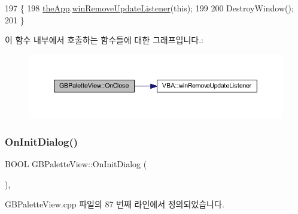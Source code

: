 \begin{DoxyCode}
197 \{
198   \mbox{\hyperlink{_v_b_a_8cpp_a8095a9d06b37a7efe3723f3218ad8fb3}{theApp}}.\mbox{\hyperlink{class_v_b_a_a2d31a0656df2230310aa8dc9e3a735d3}{winRemoveUpdateListener}}(\textcolor{keyword}{this});
199   
200   DestroyWindow();
201 \}
\end{DoxyCode}
이 함수 내부에서 호출하는 함수들에 대한 그래프입니다.\+:
\nopagebreak
\begin{figure}[H]
\begin{center}
\leavevmode
\includegraphics[width=350pt]{class_g_b_palette_view_a7cbc4954d55851e0991ee4419904fcec_cgraph}
\end{center}
\end{figure}
\mbox{\label{class_g_b_palette_view_a8d71e7140c51c2a7a81c39398497e61e}} 
\subsubsection{\texorpdfstring{On\+Init\+Dialog()}{OnInitDialog()}}
{\footnotesize\ttfamily B\+O\+OL G\+B\+Palette\+View\+::\+On\+Init\+Dialog (\begin{DoxyParamCaption}{ }\end{DoxyParamCaption})\hspace{0.3cm}{\ttfamily [protected]}, {\ttfamily [virtual]}}



G\+B\+Palette\+View.\+cpp 파일의 87 번째 라인에서 정의되었습니다.


